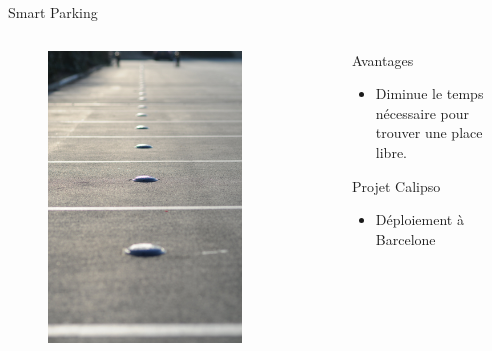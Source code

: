 \begin{frame}{Smart Parking}
  \begin{columns}
      \begin{column}{0.48\textwidth}
        \begin{figure}
          \includegraphics[width=0.8\textwidth]{figures/smart_parking.jpg}
        \end{figure}
      \end{column}
      \begin{column}{0.48\textwidth}
        \begin{block}{Avantages}
          \begin{itemize}
            \item Diminue le temps nécessaire pour trouver une place libre.
          \end{itemize}
        \end{block}
        \begin{alertblock}{Projet Calipso}
          \begin{itemize}
            \item Déploiement à Barcelone

\end{itemize}
\end{alertblock}
\end{column}
\end{columns}
\end{frame}

